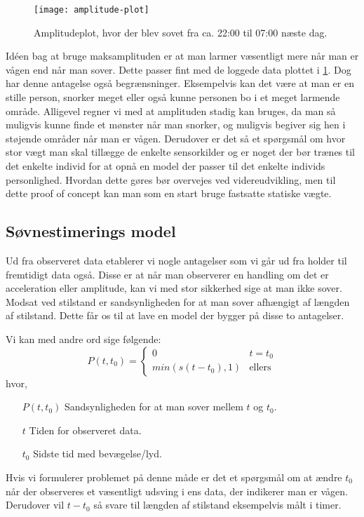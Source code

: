 \begin{figure}[h]
	\centering
	\texttt{[image: amplitude-plot]}
	\caption{Amplitudeplot, hvor der blev sovet fra ca. 22:00 til 07:00 næste dag.}\label{fig:amplplot}
\end{figure}

Idéen bag at bruge maksamplituden er at man larmer væsentligt mere når man er vågen end når man sover.
Dette passer fint med de loggede data plottet i \cref{fig:amplplot}.
Dog har denne antagelse også begrænsninger.
Eksempelvis kan det være at man er en stille person, snorker meget eller også kunne personen bo i et meget larmende område.
Alligevel regner vi med at amplituden stadig kan bruges, da man så muligvis kunne finde et mønster når man snorker, og muligvis begiver sig hen i støjende områder når man er vågen.
Derudover er det så et spørgsmål om hvor stor vægt man skal tillægge de enkelte sensorkilder og er noget der bør trænes til det enkelte individ for at opnå en model der passer til det enkelte individs personlighed.
Hvordan dette gøres bør overvejes ved videreudvikling, men til dette proof of concept kan man som en start bruge fastsatte statiske vægte.

\subsection{Søvnestimerings model}
Ud fra observeret data etablerer vi nogle antagelser som vi går ud fra holder til fremtidigt data også.
Disse er at når man observerer en handling om det er acceleration eller amplitude, kan vi med stor sikkerhed sige at man ikke sover.
Modsat ved stilstand er sandsynligheden for at man sover afhængigt af længden af stilstand.
Dette får os til at lave en model der bygger på disse to antagelser.

Vi kan med andre ord sige følgende:
\begin{equation}
P(t,t_0) =
\begin{cases}
0	& t = t_0 \\
min(s(t-t_0),1) & \text{ellers}
\end{cases}
\end{equation}
hvor,
\begin{itemize}
	\item[$P(t,t_0)$] Sandsynligheden for at man sover mellem $t$ og $t_0$. 
	\item[$t$] Tiden for observeret data.
	\item[$t_0$] Sidste tid med bevægelse/lyd.
\end{itemize}
Hvis vi formulerer problemet på denne måde er det et spørgsmål om at ændre $t_0$ når der observeres et væsentligt udsving i ens data, der indikerer man er vågen.
Derudover vil $t-t_0$ så svare til længden af stilstand eksempelvis målt i timer.

